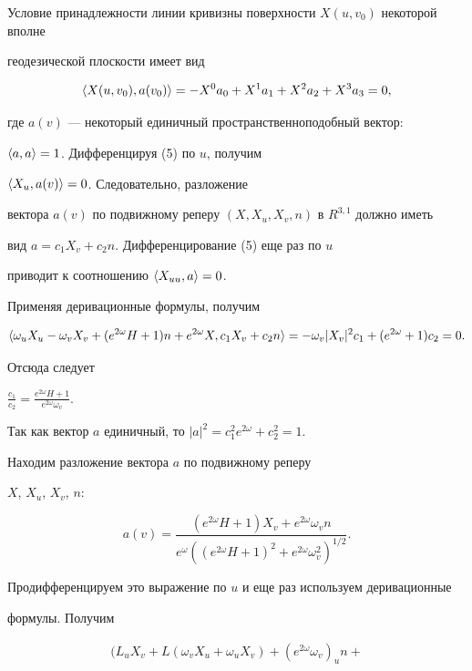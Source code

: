 \begin{pf}


Условие принадлежности линии кривизны поверхности $X(u,v_0)$ некоторой вполне


геодезической плоскости имеет вид


\begin{equation}


\la X(u,v_0),a(v_0)\ra=-X^0a_0+X^1a_1+X^2a_2+X^3a_3=0,


\end{equation}


где $a(v)$ --- некоторый единичный пространственноподобный вектор:


$\langle a,a\rangle=1$. Дифференцируя (5) по $u$, получим


$\langle X_u,a(v)\rangle=0$. Следовательно, разложение


вектора $a(v)$ по подвижному реперу $(X,X_u,X_v,n)$ в $R^{3,1}$ должно иметь


вид $a=c_1X_v+c_2n$. Дифференцирование (5) еще раз по $u$


приводит к соотношению $\langle X_{uu},a\rangle=0$.


Применяя деривационные формулы, получим


$$


\la\omega_uX_u-\omega_vX_v+(e^{2\omega}H+1)n+e^{2\omega}X,c_1X_v+c_2n\ra=


-\omega_v|X_v|^2c_1+(e^{2\omega}+1)c_2=0.


$$


Отсюда следует


$\frac{c_1}{c_2}=\frac{e^{2\omega}H+1}{e^{2\omega}\omega_v}$.


Так как вектор $a$ единичный, то $|a|^2=c_1^2e^{2\omega}+c_2^2=1$.


Находим разложение вектора $a$ по подвижному реперу


$X$, $X_u$, $X_v$, $n$:


$$


a(v)=\frac{(e^{2\omega}H+1)X_v+e^{2\omega}\omega_vn}


{e^{\omega}((e^{2\omega}H+1)^2 +e^{2\omega}\omega_v^2)^{1/2}}.


$$


Продифференцируем это выражение по $u$ и еще раз используем деривационные


формулы. Получим


\begin{multline*}


\bigg(L_uX_v+L(\omega_vX_u+\omega_uX_v)+(e^{2\omega}\omega_v)_un+



\end{multline*}
\end{pf}
